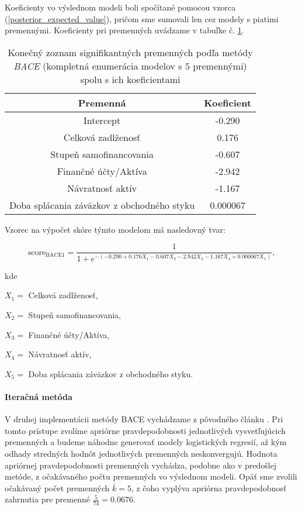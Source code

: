Koeficienty vo výslednom modeli boli spočítané pomocou vzorca (\ref{posterior_expected_value}), pričom sme sumovali len cez modely s piatimi premennými.
Koeficienty pri premenných uvádzame v tabuľke č. \ref{bace1 tabulka konecne parametre}.

\begin{table}
    \begin{tabular}{ |c|c| }
        \hline
        Premenná & Koeficient \\
        \hline
        Intercept & -0.290 \\
        \hline
        Celková zadlženosť & 0.176 \\
        \hline
        Stupeň samofinancovania & -0.607 \\
        \hline
        Finančné účty/Aktíva & -2.942 \\
        \hline
        Návratnosť aktív & -1.167 \\
        \hline
        Doba splácania záväzkov z obchodného styku & 0.000067 \\
        \hline
    \end{tabular}
    \caption{Konečný zoznam signifikantných premenných podľa metódy \emph{BACE} (kompletná enumerácia modelov s \(5\) premennými) spolu s ich koeficientami}
    \label{bace1 tabulka konecne parametre}
\end{table}

Vzorec na výpočet skóre týmto modelom má nasledovný tvar:

\[
    \text{score}_\text{BACE1} = \frac{1}{1 + e^{-(-0.290 + 0.176X_1 - 0.607X_2 - 2.942X_3 - 1.167X_4 + 0.000067X_5)}},
\]

kde

\(X_1 = \) Celková zadlženosť,

\(X_2 = \) Stupeň samofinancovania,

\(X_3 = \) Finančné účty/Aktíva,

\(X_4 = \) Návratnosť aktív,

\(X_5 = \) Doba splácania záväzkov z obchodného styku.

\paragraph{Iteračná metóda}
\label{model_bace_2}

V druhej implementácii metódy BACE vychádzame z pôvodného článku \cite{sala-i-martin}.
Pri tomto prístupe zvolíme apriórne pravdepodobnosti jednotlivých vysvetľujúcich premenných a budeme náhodne generovať modely logistických regresií,
až kým odhady stredných hodnôt jednotlivých premenných neskonvergujú.
Hodnota apriórnej pravdepodobnosti premenných vychádza, podobne ako v predošlej metóde, z očakávaného počtu premenných vo výslednom modeli.
Opäť sme zvolili očakávaný počet premenných \(\bar{k} = 5\), z čoho vyplýva apriórna pravdepodobnosť zahrnutia pre premenné \( \frac{5}{74} = 0.0676 \).

